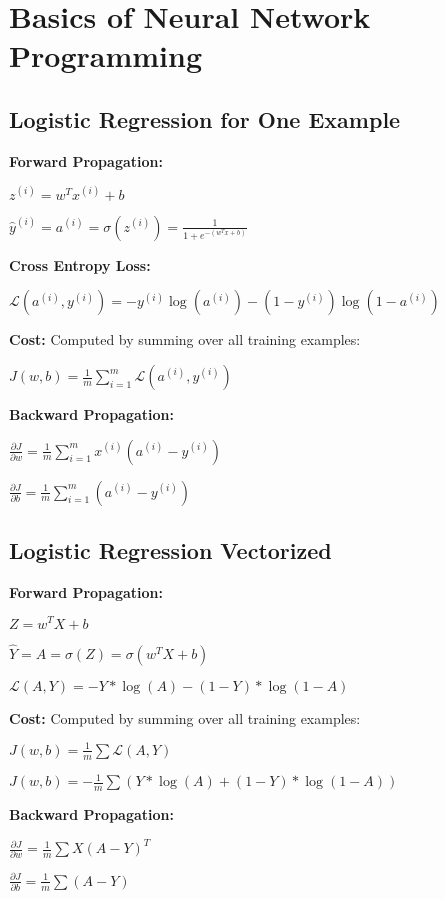 \section{Basics of Neural Network Programming}

\subsection{Logistic Regression for One Example}

\textbf{Forward Propagation:}

$z^{(i)} = w^T x^{(i)} + b $

$\hat{y}^{(i)} = a^{(i)} = \sigma(z^{(i)}) = \frac{1}{1 + e^{-(w^T x + b)}}$

\textbf{Cross Entropy Loss:}

$\mathcal{L}(a^{(i)}, y^{(i)}) =  - y^{(i)}  \log(a^{(i)}) - (1-y^{(i)} )  \log(1-a^{(i)})$

\textbf{Cost:} Computed by summing over all training examples:

$J(w, b) = \frac{1}{m} \sum_{i=1}^m \mathcal{L}(a^{(i)}, y^{(i)})$

\textbf{Backward Propagation:}

$\frac{\partial J}{\partial w} = \frac{1}{m} \sum_{i=1}^m x^{(i)} (a^{(i)}-y^{(i)})$

$\frac{\partial J}{\partial b} = \frac{1}{m} \sum_{i=1}^m (a^{(i)}-y^{(i)})$

\subsection{Logistic Regression Vectorized}

\textbf{Forward Propagation:}

$Z = w^T X + b$

$\hat{Y} = A = \sigma(Z) = \sigma(w^T X + b)$

$\mathcal{L}(A, Y) =  - Y * \log(A) - (1 - Y) * \log(1 - A)$

\textbf{Cost:} Computed by summing over all training examples:

$J(w, b) = \frac{1}{m} \sum \mathcal{L}(A, Y)$

$J(w, b) = - \frac{1}{m} \sum (Y * \log(A) + (1 - Y) * \log(1 - A))$

\textbf{Backward Propagation:}

$\frac{\partial J}{\partial w} = \frac{1}{m} \sum X (A - Y)^T$

$\frac{\partial J}{\partial b} = \frac{1}{m} \sum (A - Y)$

